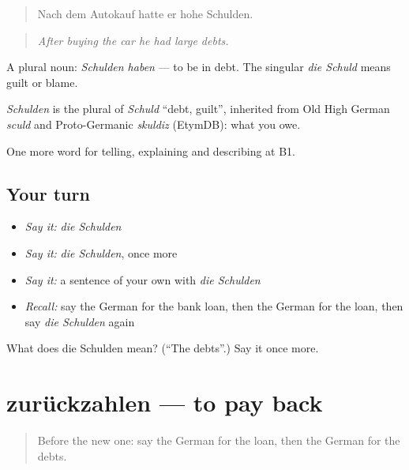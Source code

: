 \begin{quote}
Nach dem Autokauf hatte er hohe Schulden.
\end{quote}

\begin{quote}
\emph{After buying the car he had large debts.}
\end{quote}

A plural noun: \emph{Schulden haben} — to be in debt. The singular \emph{die Schuld} means guilt or blame.

\begin{cousinweb}
\emph{Schulden} is the plural of \emph{Schuld} \textquotedblleft{}debt, guilt\textquotedblright{}, inherited from Old High German \emph{sculd} and Proto-Germanic \emph{skuldiz} (EtymDB): what you owe.
\end{cousinweb}

\begin{grammarlens}[title={What you've built}]
One more word for telling, explaining and describing at B1.
\end{grammarlens}

\subsection*{Your turn}
\begin{itemize}
\raggedright
  \item \emph{Say it:} \emph{die Schulden}
  \item \emph{Say it:} \emph{die Schulden}, once more
  \item \emph{Say it:} a sentence of your own with \emph{die Schulden}
  \item \emph{Recall:} say the German for the bank loan, then the German for the loan, then say \emph{die Schulden} again
\end{itemize}

\begin{tcolorbox}[breakable,colback=teal!4,colframe=teal!35!black,title={Before you move on}]
What does die Schulden mean? (\textquotedblleft{}The debts\textquotedblright{}.) Say it once more.
\end{tcolorbox}
\section[zurückzahlen]{zurückzahlen — to pay back}

\label{lesson:GE-C388-zurueckzahlen}



\begin{quote}
Before the new one: say the German for the loan, then the German for the debts.
\end{quote}


